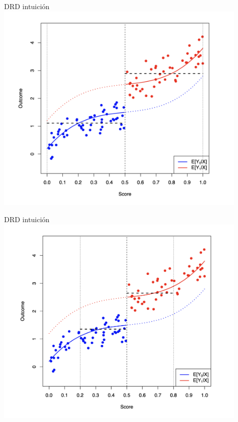 \documentclass[
  ignorenonframetext,
]{beamer}
\begin{document}
\begin{frame}{DRD intuición}
\protect\hypertarget{drd-intuiciuxf3n-1}{}
\includegraphics[width=0.9\textwidth,height=\textheight]{rd2}
\end{frame}

\begin{frame}{DRD intuición}
\protect\hypertarget{drd-intuiciuxf3n-2}{}
\includegraphics[width=0.9\textwidth,height=\textheight]{rd3}
\end{frame}
\end{document}
